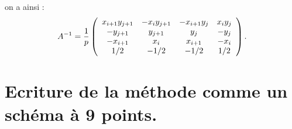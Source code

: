 \documentclass[main.tex]{subfiles}
\begin{document}
on a ainsi :
\begin{equation}
\medmuskip=1mu A^{-1} = \dfrac{1}{p}\left( \begin{array}{cccc}
 x_{i+1}y_{j+1} & - x_iy_{j+1} & - x_{i+1}y_j & x_iy_j\\
 -  y_{j+1} & y_{j+1} &  y_j & - y_j\\
 -  x_{i+1} & x_i & x_{i+1} & -  x_i \\
1 / 2 & -1 / 2 & -1 / 2& 1 / 2
\end{array}\right).
\end{equation}


\section{Ecriture de la méthode comme un schéma à 9 points.}
\end{document}
